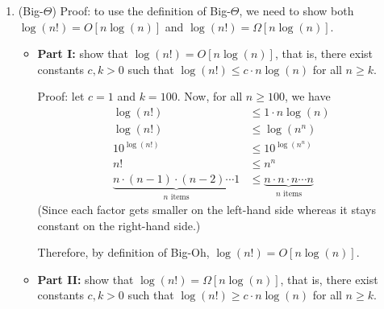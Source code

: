 \documentclass{article}
\begin{document}
\begin{enumerate}

  \item (Big-$\Theta$) Proof: to use the definition of Big-$\Theta$, we need to show both $\log(n!) = O[n\log(n)]$ and $\log(n!) = \Omega[n\log(n)]$.

    \begin{itemize}
      \item \textbf{Part I:} show that $\log(n!) = O[n\log(n)]$, that is, there exist constants $c, k > 0$ such that $\log(n!) \le c \cdot n\log(n)$ for all $n \ge k$.

        Proof: let $c = 1$ and $k = 100$. Now, for all $n \ge 100$, we have
        \begin{displaymath}
          \begin{aligned}
            \log(n!)      & \le 1 \cdot n\log(n)                                        \\
            \log(n!)      & \le \log(n^n)                                               \\
            10^{\log(n!)} & \le 10^{\log(n^n)}                                          \\
            n!            & \le n^n                                                     \\
            \underbrace{n \cdot (n-1) \cdot (n-2) \cdots 1}_{n\text{ items}}
                          & \le \underbrace{n \cdot n \cdot n\cdots n}_{n\text{ items}}
          \end{aligned}
        \end{displaymath}
        (Since each factor gets smaller on the left-hand side whereas it stays constant on the right-hand side.)

        Therefore, by definition of Big-Oh, $\log(n!) = O[n\log(n)]$.

      \item \textbf{Part II:} show that $\log(n!) = \Omega[n\log(n)]$, that is, there exist constants $c, k > 0$ such that $\log(n!) \ge c \cdot n\log(n)$ for all $n \ge k$.


\end{itemize}
\end{enumerate}
\end{document}
